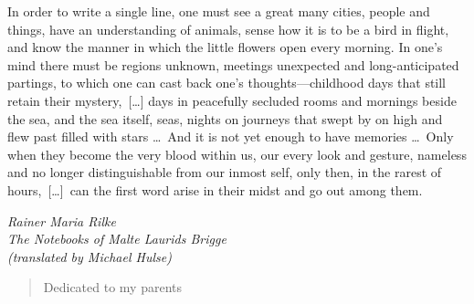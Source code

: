 
\begin{dedication} 
\setlength{\epigraphwidth}{0.63\textwidth}

\vspace*{-.25\paperheight}  
\epigraph{%
	In order to write a single line, one must see a great many cities, people and things, have an understanding of animals, sense how it is to be a bird in flight, and know the manner in which the little flowers open every morning. In one's mind there must be regions unknown, meetings unexpected and long-anticipated partings, to which one can cast back one's thoughts---childhood days that still retain their mystery,~[\dots] days in peacefully secluded rooms and mornings beside the sea, and the sea itself, seas, nights on journeys that swept by on high and flew past filled with stars \dots~And it is not yet enough to have memories \dots~Only when they become the very blood within us, our every look and gesture, nameless and no longer distinguishable from our inmost self, only then, in the rarest of hours,~[\dots]~can the first word arise in their midst and go out among them.}{\textit{Rainer Maria Rilke\\ The Notebooks of Malte Laurids Brigge~\\(translated by Michael Hulse)}}


\begin{quote} 
	\centering 
	\LARGE{Dedicated to my parents} 
\end{quote}



\end{dedication}

